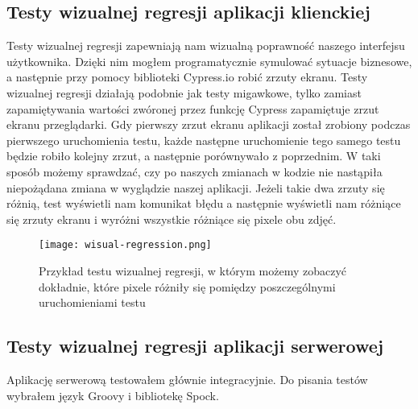 \subsection{Testy wizualnej regresji aplikacji klienckiej}
Testy wizualnej regresji zapewniają nam wizualną poprawność naszego interfejsu użytkownika. Dzięki nim mogłem programatycznie symulować sytuacje biznesowe, a następnie przy pomocy biblioteki Cypress.io robić zrzuty ekranu. Testy wizualnej regresji działają podobnie jak testy migawkowe, tylko zamiast zapamiętywania wartości zwóronej przez funkcję Cypress zapamiętuje zrzut ekranu przeglądarki. Gdy pierwszy zrzut ekranu aplikacji został zrobiony podczas pierwszego uruchomienia testu, każde następne uruchomienie tego samego testu będzie robiło kolejny zrzut, a następnie porównywało z poprzednim. W taki sposób możemy sprawdzać, czy po naszych zmianach w kodzie nie nastąpiła niepożądana zmiana w wyglądzie naszej aplikacji. Jeżeli takie dwa zrzuty się różnią, test wyświetli nam komunikat błędu a następnie wyświetli nam różniące się zrzuty ekranu i wyróżni wszystkie różniące się pixele obu zdjęć.

\begin{figure}
    \texttt{[image: wisual-regression.png]}
    \caption{Przykład testu wizualnej regresji, w którym możemy zobaczyć dokładnie, które pixele różniły się pomiędzy poszczególnymi uruchomieniami testu} \label{fig-cypress-vr}
\end{figure}


\subsection{Testy wizualnej regresji aplikacji serwerowej}
Aplikację serwerową testowałem głównie integracyjnie. Do pisania testów wybrałem język Groovy i bibliotekę Spock.



